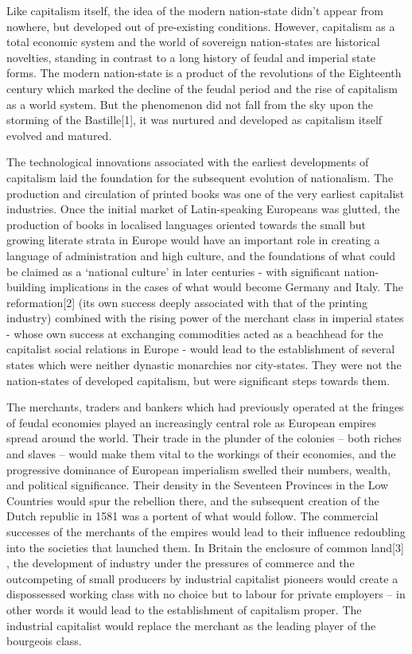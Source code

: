 Like capitalism itself, the idea of the modern nation-state didn’t appear from nowhere, but developed out of pre-existing conditions.
However, capitalism as a total economic system and the world of sovereign nation-states are historical novelties, standing in contrast to a long history of feudal and imperial state forms.
The modern nation-state is a product of the revolutions of the Eighteenth century which marked the decline of the feudal period and the rise of capitalism as a world system.
But the phenomenon did not fall from the sky upon the storming of the Bastille[1], it was nurtured and developed as capitalism itself evolved and matured.

The technological innovations associated with the earliest developments of capitalism laid the foundation for the subsequent evolution of nationalism.
The production and circulation of printed books was one of the very earliest capitalist industries.
Once the initial market of Latin-speaking Europeans was glutted, the production of books in localised languages oriented towards the small but growing literate strata in Europe would have an important role in creating a language of administration and high culture, and the foundations of what could be claimed as a ‘national culture’ in later centuries - with significant nation-building implications in the cases of what would become Germany and Italy.
The reformation[2] (its own success deeply associated with that of the printing industry) combined with the rising power of the merchant class in imperial states - whose own success at exchanging commodities acted as a beachhead for the capitalist social relations in Europe - would lead to the establishment of several states which were neither dynastic monarchies nor city-states.
They were not the nation-states of developed capitalism, but were significant steps towards them.

The merchants, traders and bankers which had previously operated at the fringes of feudal economies played an increasingly central role as European empires spread around the world.
Their trade in the plunder of the colonies – both riches and slaves – would make them vital to the workings of their economies, and the progressive dominance of European imperialism swelled their numbers, wealth, and political significance.
Their density in the Seventeen Provinces in the Low Countries would spur the rebellion there, and the subsequent creation of the Dutch republic in 1581 was a portent of what would follow.
The commercial successes of the merchants of the empires would lead to their influence redoubling into the societies that launched them.
In Britain the enclosure of common land[3] , the development of industry under the pressures of commerce and the outcompeting of small producers by industrial capitalist pioneers would create a dispossessed working class with no choice but to labour for private employers – in other words it would lead to the establishment of capitalism proper.
The industrial capitalist would replace the merchant as the leading player of the bourgeois class.

